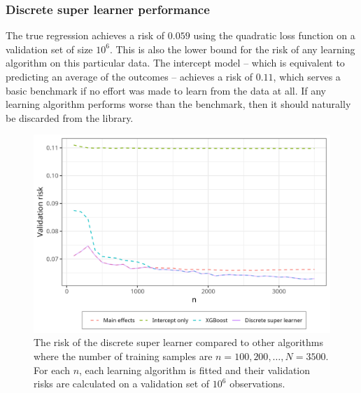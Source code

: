 \documentclass[./main.tex]{subfiles}
\begin{document}
\subsubsection{Discrete super learner performance}
The true regression achieves a risk of $ 0.059 $ using the quadratic loss function on a validation set of size $ 10^{6} $. This is also the lower bound for the risk of any learning algorithm on this particular data. The intercept model -- which is equivalent to predicting an average of the outcomes -- achieves a risk of $ 0.11 $, which serves a basic benchmark if no effort was made to learn from the data at all. If any learning algorithm performs worse than the benchmark, then it should naturally be discarded from the library.  
\begin{figure}[H]
    \centering
    \includegraphics[width=\textwidth]{figures/dsl_loss.png}
    \caption{The risk of the discrete super learner compared to other algorithms where the number of training samples are $n = 100, 200, \dots , N = 3500 $. For each $ n $, each learning algorithm is fitted and their validation risks are calculated on a validation set of $ 10^{6} $ observations.} 
    \label{fig:loss_min_of_both}
\end{figure}
\end{document}
